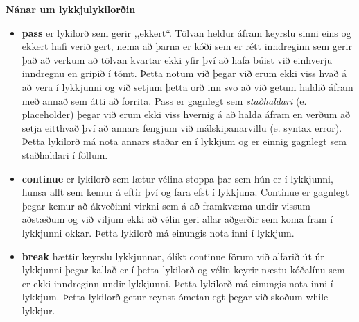 \begin{itarefni}
\textbf{Nánar um lykkjulykilorðin}\\	
\begin{itemize}[leftmargin=*]
\item \textbf{pass} er lykilorð sem gerir ,,ekkert“.
Tölvan heldur áfram keyrslu sinni eins og ekkert hafi verið gert, nema að þarna er kóði sem er rétt inndreginn sem gerir það að verkum að tölvan kvartar ekki yfir því að hafa búist við einhverju inndregnu en gripið í tómt.
Þetta notum við þegar við erum ekki viss hvað á að vera í lykkjunni og við setjum þetta orð inn svo að við getum haldið áfram með annað sem átti að forrita.
Pass er gagnlegt sem \textit{staðhaldari} (e. placeholder) þegar við erum ekki viss hvernig á að halda áfram en verðum að setja eitthvað því að annars fengjum við málskipanarvillu (e. syntax error).
Þetta lykilorð má nota annars staðar en í lykkjum og er einnig gagnlegt sem staðhaldari í föllum.
\item \textbf{continue} er lykilorð sem lætur vélina stoppa þar sem hún er í lykkjunni, hunsa allt sem kemur á eftir því og fara efst í lykkjuna.
Continue er gagnlegt þegar kemur að ákveðinni virkni sem á að framkvæma undir vissum aðstæðum og við viljum ekki að vélin geri allar aðgerðir sem koma fram í lykkjunni okkar.
Þetta lykilorð má einungis nota inni í lykkjum.
\item \textbf{break} hættir keyrslu lykkjunnar, ólíkt continue förum við alfarið út úr lykkjunni þegar kallað er í þetta lykilorð og vélin keyrir næstu kóðalínu sem er ekki inndreginn undir lykkjunni.
Þetta lykilorð má einungis nota inni í lykkjum.		
Þetta lykilorð getur reynst ómetanlegt þegar við skoðum while-lykkjur.
\end{itemize}

\end{itarefni}


